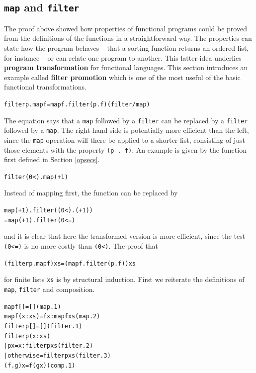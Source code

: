 \subsection*{\texttt{map} and \texttt{filter}}


The proof above showed how properties of functional programs could be proved
from the definitions of the functions in a straightforward way. The properties
can state how the program behaves -- that a sorting function returns an ordered
list, for instance -- or can relate one program to another. This latter idea
underlies \textbf{program transformation}
for functional languages. This section
introduces an example 
called \textbf{filter promotion} which is one of the most
useful of the basic functional transformations.
\begin{alltt}
filter p . map f = map f . filter (p . f)\hfill(filter/map)\label{filterMap}
\end{alltt}
The equation says that a \texttt{map} followed by a \texttt{filter} can be replaced
by a \texttt{filter} followed by a \texttt{map}. The right-hand side is potentially
more efficient than the left, since the \texttt{map} operation will there be
applied to a shorter list, consisting of just those elements with the property
\texttt{(p .\ f)}.
An example is given by the function first defined in Section \ref{opsecs}.
\begin{alltt}
filter (0<) . map (+1)
\end{alltt}
Instead of mapping first, the function can be replaced by
\begin{alltt}
map (+1) . filter ((0<) . (+1))
 = map (+1) . filter (0<=)
\end{alltt}
and it is clear that here the transformed version is more efficient,
since the test \texttt{(0<=)} is no more
costly than \texttt{(0<)}.
The proof that
\begin{alltt}
(filter p . map f) xs = (map f . filter (p . f)) xs
\end{alltt}
for finite lists \texttt{xs} is by structural induction.
First we reiterate the definitions of \texttt{map}, \texttt{filter} and {\mi
composition}.
\begin{alltt}
map f []        = [] \hfill (map.1)
map f (x:xs)    = f x : map f xs\hfill (map.2)
\bl
filter p []     = []\hfill (filter.1)
filter p (x:xs) 
  | p x         = x : filter p xs\hfill (filter.2)
  | otherwise   =     filter p xs\hfill (filter.3)
\bl
(f . g) x       = f (g x)\hfill (comp.1)
\end{alltt}
